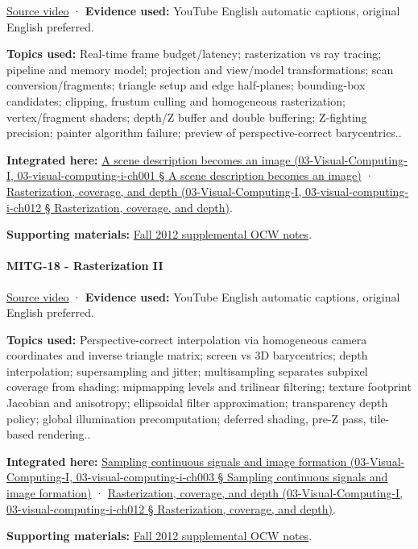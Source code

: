 \href{https://www.youtube.com/watch?v=aCTEiX59ERM}{Source video} · \textbf{Evidence used:} YouTube English automatic captions, original English preferred.

\textbf{Topics used:} Real-time frame budget/latency; rasterization vs ray tracing; pipeline and memory model; projection and view/model transformations; scan conversion/fragments; triangle setup and edge half-planes; bounding-box candidates; clipping, frustum culling and homogeneous rasterization; vertex/fragment shaders; depth/Z buffer and double buffering; Z-fighting precision; painter algorithm failure; preview of perspective-correct barycentrics..

\textbf{Integrated here:} \href{}{A scene description becomes an image (03-Visual-Computing-I, 03-visual-computing-i-ch001 § A scene description becomes an image)} · \href{}{Rasterization, coverage, and depth (03-Visual-Computing-I, 03-visual-computing-i-ch012 § Rasterization, coverage, and depth)}.

\textbf{Supporting materials:} \href{https://ocw.mit.edu/courses/6-837-computer-graphics-fall-2012/pages/lecture-notes/}{Fall 2012 supplemental OCW notes}.

\paragraph{MITG-18 - Rasterization II}\label{mitg-18---rasterization-ii}

\href{https://www.youtube.com/watch?v=bZAu7QtyYvo}{Source video} · \textbf{Evidence used:} YouTube English automatic captions, original English preferred.

\textbf{Topics used:} Perspective-correct interpolation via homogeneous camera coordinates and inverse triangle matrix; screen vs 3D barycentrics; depth interpolation; supersampling and jitter; multisampling separates subpixel coverage from shading; mipmapping levels and trilinear filtering; texture footprint Jacobian and anisotropy; ellipsoidal filter approximation; transparency depth policy; global illumination precomputation; deferred shading, pre-Z pass, tile-based rendering..

\textbf{Integrated here:} \href{}{Sampling continuous signals and image formation (03-Visual-Computing-I, 03-visual-computing-i-ch003 § Sampling continuous signals and image formation)} · \href{}{Rasterization, coverage, and depth (03-Visual-Computing-I, 03-visual-computing-i-ch012 § Rasterization, coverage, and depth)}.

\textbf{Supporting materials:} \href{https://ocw.mit.edu/courses/6-837-computer-graphics-fall-2012/pages/lecture-notes/}{Fall 2012 supplemental OCW notes}.

